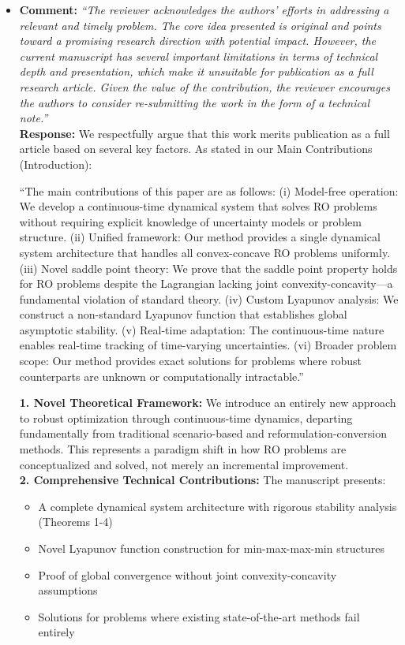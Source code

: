 \documentclass[journal,twoside,web]{ieeecolor}
\newcommand{\rev}[1]{\textcolor{revisionblue}{#1}}
\begin{document}
\begin{itemize}

\item \textbf{Comment:} \textit{``The reviewer acknowledges the authors' efforts in addressing a relevant and timely problem. The core idea presented is original and points toward a promising research direction with potential impact. However, the current manuscript has several important limitations in terms of technical depth and presentation, which make it unsuitable for publication as a full research article. Given the value of the contribution, the reviewer encourages the authors to consider re-submitting the work in the form of a technical note.''}\\

\textbf{Response:} We respectfully argue that this work merits publication as a full article based on several key factors. As stated in our Main Contributions (Introduction):

\rev{``The main contributions of this paper are as follows: (i) Model-free operation: We develop a continuous-time dynamical system that solves RO problems without requiring explicit knowledge of uncertainty models or problem structure. (ii) Unified framework: Our method provides a single dynamical system architecture that handles all convex-concave RO problems uniformly. (iii) Novel saddle point theory: We prove that the saddle point property holds for RO problems despite the Lagrangian lacking joint convexity-concavity—a fundamental violation of standard theory. (iv) Custom Lyapunov analysis: We construct a non-standard Lyapunov function that establishes global asymptotic stability. (v) Real-time adaptation: The continuous-time nature enables real-time tracking of time-varying uncertainties. (vi) Broader problem scope: Our method provides exact solutions for problems where robust counterparts are unknown or computationally intractable.''}

 \textbf{1. Novel Theoretical Framework:} We introduce an entirely new approach to robust optimization through continuous-time dynamics, departing fundamentally from traditional scenario-based and reformulation-conversion methods. This represents a paradigm shift in how RO problems are conceptualized and solved, not merely an incremental improvement.\\

  \textbf{2. Comprehensive Technical Contributions:} The manuscript presents:
\begin{itemize}
\item A complete dynamical system architecture with rigorous stability analysis (Theorems 1-4)
\item Novel Lyapunov function construction for min-max-max-min structures
\item Proof of global convergence without joint convexity-concavity assumptions
\item Solutions for problems where existing state-of-the-art methods fail entirely
\end{itemize}


\end{itemize}
\end{document}
